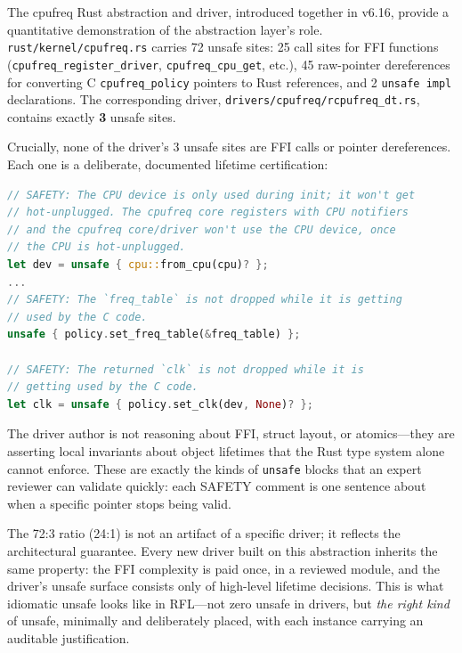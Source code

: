 The cpufreq Rust abstraction and driver, introduced together in v6.16, provide a quantitative demonstration of the abstraction layer's role.
\texttt{rust/kernel/cpufreq.rs} carries 72 unsafe sites: 25 call sites for FFI functions (\texttt{cpufreq\_register\_driver}, \texttt{cpufreq\_cpu\_get}, etc.), 45 raw-pointer dereferences for converting C \texttt{cpufreq\_policy} pointers to Rust references, and 2 \texttt{unsafe impl} declarations.
The corresponding driver, \texttt{drivers/cpufreq/rcpufreq\_dt.rs}, contains exactly \textbf{3} unsafe sites.

Crucially, none of the driver's 3 unsafe sites are FFI calls or pointer dereferences.
Each one is a deliberate, documented lifetime certification:

\begin{lstlisting}[language=Rust,columns=fullflexible]
// SAFETY: The CPU device is only used during init; it won't get
// hot-unplugged. The cpufreq core registers with CPU notifiers
// and the cpufreq core/driver won't use the CPU device, once
// the CPU is hot-unplugged.
let dev = unsafe { cpu::from_cpu(cpu)? };
...
// SAFETY: The `freq_table` is not dropped while it is getting
// used by the C code.
unsafe { policy.set_freq_table(&freq_table) };

// SAFETY: The returned `clk` is not dropped while it is
// getting used by the C code.
let clk = unsafe { policy.set_clk(dev, None)? };
\end{lstlisting}

The driver author is not reasoning about FFI, struct layout, or atomics---they are asserting local invariants about object lifetimes that the Rust type system alone cannot enforce.
These are exactly the kinds of \texttt{unsafe} blocks that an expert reviewer can validate quickly: each SAFETY comment is one sentence about when a specific pointer stops being valid.

The 72:3 ratio (24:1) is not an artifact of a specific driver; it reflects the architectural guarantee.
Every new driver built on this abstraction inherits the same property: the FFI complexity is paid once, in a reviewed module, and the driver's unsafe surface consists only of high-level lifetime decisions.
This is what idiomatic unsafe looks like in RFL---not zero unsafe in drivers, but \emph{the right kind} of unsafe, minimally and deliberately placed, with each instance carrying an auditable justification.
